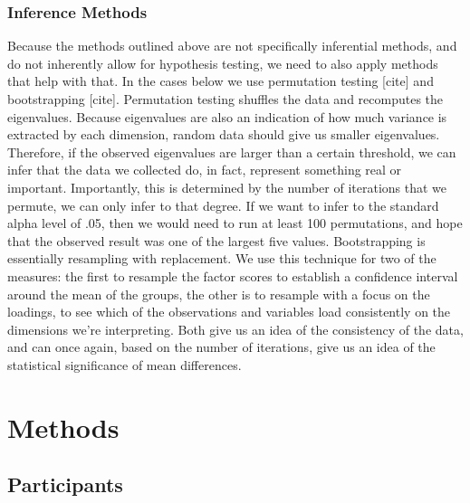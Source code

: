 \documentclass[
  english,
  man,floatsintext]{apa6}
\begin{document}
\hypertarget{inference-methods}{%
\subsubsection{Inference Methods}\label{inference-methods}}

Because the methods outlined above are not specifically inferential methods, and do not inherently allow for hypothesis testing, we need to also apply methods that help with that. In the cases below we use permutation testing {[}cite{]} and bootstrapping {[}cite{]}. Permutation testing shuffles the data and recomputes the eigenvalues. Because eigenvalues are also an indication of how much variance is extracted by each dimension, random data should give us smaller eigenvalues. Therefore, if the observed eigenvalues are larger than a certain threshold, we can infer that the data we collected do, in fact, represent something real or important. Importantly, this is determined by the number of iterations that we permute, we can only infer to that degree. If we want to infer to the standard alpha level of .05, then we would need to run at least 100 permutations, and hope that the observed result was one of the largest five values.
Bootstrapping is essentially resampling with replacement. We use this technique for two of the measures: the first to resample the factor scores to establish a confidence interval around the mean of the groups, the other is to resample with a focus on the loadings, to see which of the observations and variables load consistently on the dimensions we're interpreting. Both give us an idea of the consistency of the data, and can once again, based on the number of iterations, give us an idea of the statistical significance of mean differences.

\hypertarget{methods}{%
\section{Methods}\label{methods}}

\hypertarget{participants}{%
\subsection{Participants}\label{participants}}
\end{document}

